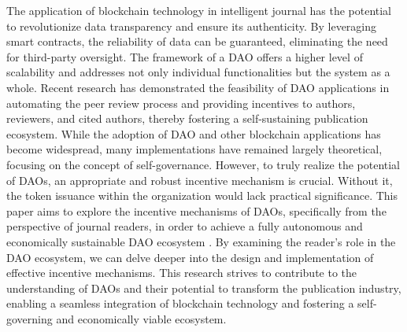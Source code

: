 \documentclass[lettersize,journal]{IEEEtran}
\begin{document}
The application of blockchain technology in intelligent journal has the potential to revolutionize data transparency and ensure its authenticity. By leveraging smart contracts, the reliability of data can be guaranteed, eliminating the need for third-party oversight. The framework of a DAO offers a higher level of scalability and addresses not only individual functionalities but the system as a whole.
Recent research has demonstrated the feasibility of DAO applications in automating the peer review process and providing incentives to authors, reviewers, and cited authors, thereby fostering a self-sustaining publication ecosystem. While the adoption of DAO and other blockchain applications has become widespread, many implementations have remained largely theoretical, focusing on the concept of self-governance.
However, to truly realize the potential of DAOs, an appropriate and robust incentive mechanism is crucial. Without it, the token issuance within the organization would lack practical significance. This paper aims to explore the incentive mechanisms of DAOs, specifically from the perspective of journal readers, in order to achieve a fully autonomous and economically sustainable DAO ecosystem \cite{ding2022desci}.
By examining the reader's role in the DAO ecosystem, we can delve deeper into the design and implementation of effective incentive mechanisms. This research strives to contribute to the understanding of DAOs and their potential to transform the publication industry, enabling a seamless integration of blockchain technology and fostering a self-governing and economically viable ecosystem.
\end{document}
